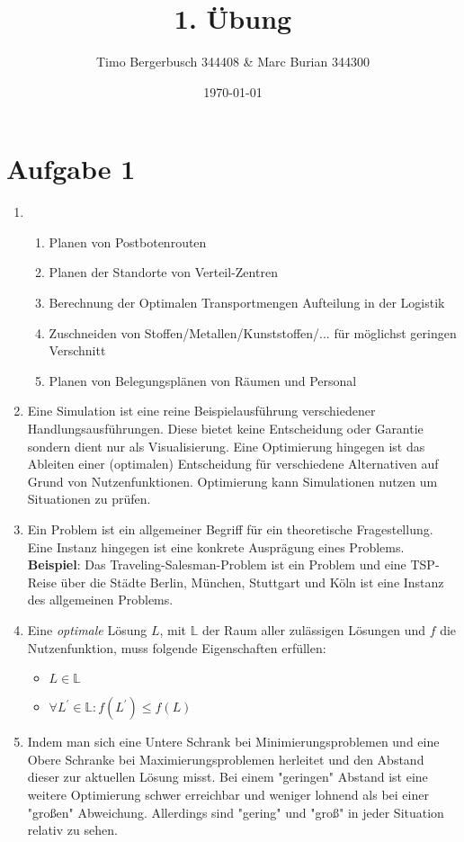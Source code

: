 \documentclass[12pt]{article}
\begin{document}
	
	\title{1. Übung}
	\author{Timo Bergerbusch 344408 \& Marc Burian 344300}
	\date{\specialdate\today}
	\maketitle
	
	
	\section{Aufgabe 1}
	\begin{enumerate}[label=(\alph*)]
		\item \begin{enumerate}[label=(\roman*)] 
				\item Planen von Postbotenrouten
				\item Planen der Standorte von Verteil-Zentren
				\item Berechnung der Optimalen Transportmengen Aufteilung in der Logistik
				\item Zuschneiden von Stoffen/Metallen/Kunststoffen/... für möglichst geringen Verschnitt
				\item Planen von Belegungsplänen von Räumen und Personal
			\end{enumerate}
		\item Eine Simulation ist eine reine Beispielausführung verschiedener Handlungsausführungen. Diese bietet keine Entscheidung oder Garantie sondern dient nur als Visualisierung. \newline
		Eine Optimierung hingegen ist das Ableiten einer (optimalen) Entscheidung für verschiedene Alternativen auf Grund von Nutzenfunktionen. Optimierung kann Simulationen nutzen um Situationen zu prüfen.
		\item Ein Problem ist ein allgemeiner Begriff für ein theoretische Fragestellung. Eine Instanz hingegen ist eine konkrete Ausprägung eines Problems. \newline
		\textbf{Beispiel}: Das Traveling-Salesman-Problem ist ein Problem und eine TSP-Reise über die Städte Berlin, München, Stuttgart und Köln ist eine Instanz des allgemeinen Problems.
		\item Eine \textit{optimale} Lösung $L$, mit $\mathbb{L}$ der Raum aller zulässigen Lösungen und $f$ die Nutzenfunktion, muss folgende Eigenschaften erfüllen:
			\begin{itemize}
				\item $L \in \mathbb{L}$
				\item $\forall L^\prime \in \mathbb{L}: f(L^\prime) \le f(L)$
			\end{itemize}
		\item Indem man sich eine Untere Schrank bei Minimierungsproblemen und eine Obere Schranke bei Maximierungsproblemen herleitet und den Abstand dieser zur aktuellen Lösung misst. Bei einem "geringen" Abstand ist eine weitere Optimierung schwer erreichbar und weniger lohnend als bei einer "großen" Abweichung. Allerdings sind "gering" und "groß" in jeder Situation relativ zu sehen.
	\end{enumerate}
\end{document}
